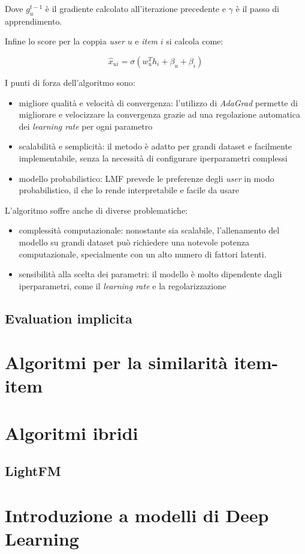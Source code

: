 Dove $g_u^{t-1}$ è il gradiente calcolato all'iterazione precedente e $\gamma$ è il passo di apprendimento.

Infine lo score per la coppia \textit{user} $u$ e \textit{item} $i$ si calcola come:

\[
\hat{x}_{ui} = \sigma(w_u^T h_i + \beta_u + \beta_i)
\]

I punti di forza dell'algoritmo sono:

\begin{itemize}
    \item migliore qualità e velocità di convergenza: l'utilizzo di \textit{AdaGrad} permette di migliorare e velocizzare la convergenza grazie ad una regolazione automatica dei \textit{learning rate} per ogni parametro
    \item scalabilità e semplicità: il metodo è adatto per grandi dataset e facilmente implementabile, senza la necessità di configurare iperparametri complessi
    \item modello probabilistico: LMF prevede le preferenze degli \textit{user} in modo probabilistico, il che lo rende interpretabile e facile da usare
\end{itemize}

L'algoritmo soffre anche di diverse problematiche:

\begin{itemize}
    \item complessità computazionale: nonostante sia scalabile, l'allenamento del modello su grandi dataset può richiedere una notevole potenza computazionale, specialmente con un alto numero di fattori latenti.
    \item sensibilità alla scelta dei parametri: il modello è molto dipendente dagli iperparametri, come il \textit{learning rate} e la regolarizzazione
\end{itemize}

\subsection{Evaluation implicita}\label{evaluation-implicita}

\section{Algoritmi per la similarità item-item}\label{algoritmi-per-la-similarita-item-item}

\section{Algoritmi ibridi}\label{algoritmi-ibridi}

\subsection{LightFM}\label{lightfm}

\section{Introduzione a modelli di Deep Learning}\label{introduzione-a-modelli-di-deep-learning}
